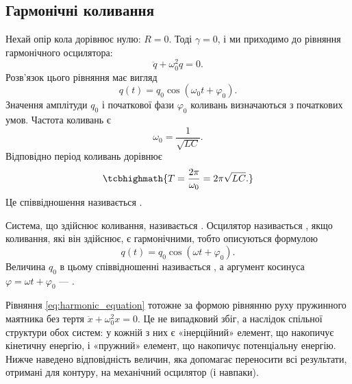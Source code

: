 \subsection*{Гармонічні коливання}

Нехай опір кола дорівнює нулю: $R = 0$. Тоді $\gamma = 0$, і ми
приходимо до рівняння гармонічного осцилятора:
\begin{equation}\label{eq:harmonic_equation}
	\ddot{q} + \omega_0^2 q = 0.
\end{equation}
Розв'язок цього рівняння має вигляд
\begin{equation}\label{eq:harmonic_solution}
	q(t) = q_0 \cos(\omega_0 t + \varphi_0).
\end{equation}
Значення амплітуди $q_0$ і початкової фази $\varphi_0$ коливань визначаються
з початкових умов. Частота коливань є
\begin{equation}\label{eq:frequency}
	\omega_0 = \frac{1}{\sqrt{LC}}.
\end{equation}
Відповідно період коливань дорівнює
\begin{equation}\label{eq:Thomson_formula}
	\tcbhighmath{
		T = \frac{2\pi}{\omega_0} = 2\pi\sqrt{LC}.
	}
\end{equation}
Це співвідношення називається .

Система, що здійснює коливання, називається . Осцилятор називається , якщо коливання, які він здійснює,
є гармонічними, тобто описуються формулою
\begin{equation}\label{eq:harmonic_general}
	q(t) = q_0 \cos(\omega t + \varphi_0).
\end{equation}
Величина $q_0$ в цьому співвідношенні називається , а аргумент
косинуса $\varphi = \omega t + \varphi_0$ --- .

Рівняння \eqref{eq:harmonic_equation} тотожне за формою рівнянню руху
пружинного маятника без тертя $\ddot{x} + \omega_0^2 x = 0$. Це не
випадковий збіг, а наслідок спільної структури обох систем: у кожній з
них є «інерційний» елемент, що накопичує кінетичну енергію, і
«пружний» елемент, що накопичує потенціальну енергію. Нижче наведено
відповідність величин, яка допомагає переносити всі результати,
отримані для контуру, на механічний осцилятор (і навпаки).

